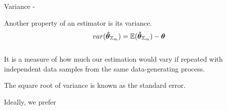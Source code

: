 
\begin{frame}[t,allowframebreaks]{Variance -}

    Another property of an estimator is its \gls{variance}.\\

    \begin{equation}
        var(\boldsymbol{\hat{\theta}}_{\mathbb{X}_{m}}) = 
          \mathbb{E}(\boldsymbol{\hat{\theta}}_{\mathbb{X}_{m}}) - \boldsymbol{\theta}
        \label{eq:variance}
    \end{equation}\\
    
    It is a measure of how much our estimation 
    would vary if repeated with independent data samples from 
    the same data-generating process.

    The square root of \gls{variance} is known as 
    the \gls{standard error}.

    Ideally, we prefer 

\end{frame}